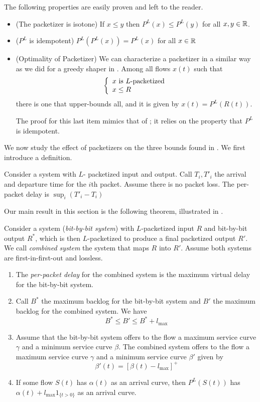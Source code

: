 The following properties are easily proven and left to the reader.
\begin{itemize}
\item (The packetizer is isotone) If $x\leq y$
then $P^L(x) \leq P^L(y)$ for all $x,y \in
 \mathbb{R}$.
 \item ($P^L$ is idempotent) $P^L(P^L(x))=P^L(x)$ for all $x \in
 \mathbb{R}$
\item (Optimality of Packetizer) We can
characterize a packetizer in a similar way as we did for a greedy
shaper in . Among all flows $x(t)$ such that
\begin{equation}\mylabel{eq-shap-pack}
  \bracket {
x \mbox{ is } L \mbox{-packetized}\\
 x \leq R
  }
\end{equation}
there is one that upper-bounds all, and it is given by $x(t)=P^L(R(t))$.

The proof for this last item mimics that of ; it
relies on the property that $P^L$ is idempotent.
\end{itemize}

We now study the effect of packetizers on the three bounds found
in . We first introduce a definition.
\begin{definition}
Consider a system with $L$- packetized input and output. Call
$T_i, T'_i$ the arrival and departure time for the $i$th packet.
Assume there is no packet loss. The per-packet delay is $\sup_i
(T'_i -T_i)$
\end{definition}

Our main result in this section is the following theorem,
illustrated in .
\begin{theorem}
Consider a system (\emph{bit-by-bit system}) with $L$-packetized
input $R$ and bit-by-bit output $R^*$, which is then
$L$-packetized to produce a final packetized output $R'$. We call
\emph{combined system} the system that maps $R$ into $R'$. Assume
both systems are first-in-first-out and lossless.
\begin{enumerate}
  \item The \emph{per-packet delay} for the combined system
   is the maximum virtual delay for the bit-by-bit system.
  \item Call $B^*$ the maximum backlog
for the bit-by-bit system and $B'$ the maximum backlog for the
combined system. We have $$B^*\leq B' \leq B^* + l_{\max}$$
  \item Assume that
the bit-by-bit system offers to the flow a maximum service curve
$\gamma$ and a minimum service curve $\beta$. The combined system
offers to the flow a maximum service curve $\gamma$ and a minimum
service curve $\beta'$ given by
$$\beta'(t) = [\beta(t)-l_{\max}]^+
$$
\item If some flow $S(t)$ has $\alpha(t)$ as an arrival curve, then
$P^L(S(t))$ has $\alpha(t) + l_{\max} 1_{\{t >0\}}$ as an arrival
curve.
\end{enumerate}
\end{theorem}

